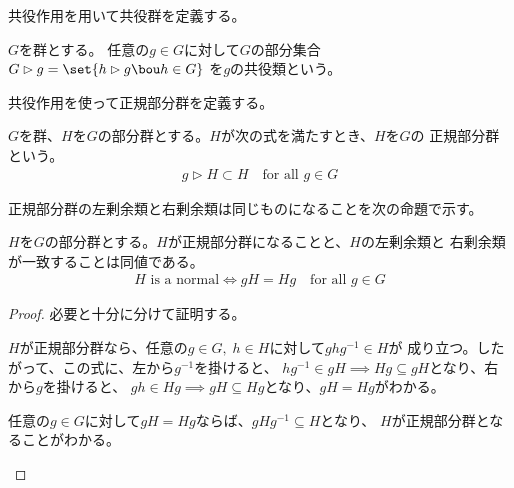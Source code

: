 	共役作用を用いて共役群を定義する。

	\begin{definition}\label{def:共役類} %
		$G$を群とする。
		任意の$g\in G$に対して$G$の部分集合$G\rhd g=\set{h\rhd g\bou h\in G}$
		を$g$の共役類という。
	\end{definition} %

	共役作用を使って正規部分群を定義する。

	\begin{definition}[正規部分群]\label{def:正規部分群} %
		$G$を群、$H$を$G$の部分群とする。$H$が次の式を満たすとき、$H$を$G$の
		正規部分群という。
		\begin{equation*}\begin{split} %
			g\rhd H\subset H \quad\text{for all }g\in G
		\end{split}\end{equation*} %
	\end{definition} %

	正規部分群の左剰余類と右剰余類は同じものになることを次の命題で示す。

	\begin{proposition}[正規部分群と剰余類]\label{prop:正規部分群と剰余類} %
		$H$を$G$の部分群とする。$H$が正規部分群になることと、$H$の左剰余類と
		右剰余類が一致することは同値である。
		\begin{equation*}\begin{split} %
			H\text{ is a normal} \iff gH = Hg \quad\text{for all }g\in G
		\end{split}\end{equation*} %
	\end{proposition} %
	\begin{proof} 必要と十分に分けて証明する。
		\begin{description}\setlength{\itemsep}{-1mm} %
			\item[正規部分群$\implies$左右の剰余類が一致]
			$H$が正規部分群なら、任意の$g\in G,\;h\in H$に対して$ghg^{-1}\in H$が
			成り立つ。したがって、この式に、左から$g^{-1}$を掛けると、
			$hg^{-1}\in gH\implies Hg\subseteq gH$となり、右から$g$を掛けると、
			$gh\in Hg\implies gH\subseteq Hg$となり、$gH=Hg$がわかる。
			\item[左右の剰余類が一致$\implies$正規部分群] 
			任意の$g\in G$に対して$gH=Hg$ならば、$gHg^{-1}\subseteq H$となり、
			$H$が正規部分群となることがわかる。
		\end{description} %
	\end{proof}

